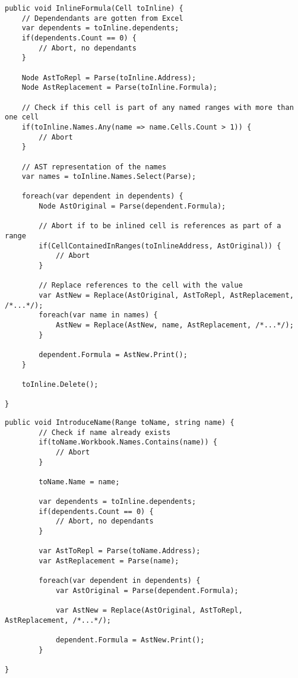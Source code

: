 \lstset{style=sharpc}
\begin{lstlisting}[float,caption={Inline Formula Refactoring (simplified)}, label={lst:inlineformula}]
public void InlineFormula(Cell toInline) {
	// Dependendants are gotten from Excel
	var dependents = toInline.dependents;
	if(dependents.Count == 0) {
		// Abort, no dependants
	}
	
	Node AstToRepl = Parse(toInline.Address);
	Node AstReplacement = Parse(toInline.Formula);
	
	// Check if this cell is part of any named ranges with more than one cell
	if(toInline.Names.Any(name => name.Cells.Count > 1)) {
		// Abort
	}
	
	// AST representation of the names
	var names = toInline.Names.Select(Parse);
	
	foreach(var dependent in dependents) {
		Node AstOriginal = Parse(dependent.Formula);
		
		// Abort if to be inlined cell is references as part of a range
		if(CellContainedInRanges(toInlineAddress, AstOriginal)) {
			// Abort
		}
		
		// Replace references to the cell with the value
		var AstNew = Replace(AstOriginal, AstToRepl, AstReplacement, /*...*/);
		foreach(var name in names) {
			AstNew = Replace(AstNew, name, AstReplacement, /*...*/);
		}
		
		dependent.Formula = AstNew.Print();
	}
	
	toInline.Delete();
	
}
\end{lstlisting}

\lstset{style=sharpc}
\begin{lstlisting}[float,caption={Introduce Cell Name (simplified)}, label={lst:introducecellname}]
public void IntroduceName(Range toName, string name) {
		// Check if name already exists
		if(toName.Workbook.Names.Contains(name)) {
			// Abort
		}
		
		toName.Name = name;
		
		var dependents = toInline.dependents;
		if(dependents.Count == 0) {
			// Abort, no dependants
		}
		
		var AstToRepl = Parse(toName.Address);
		var AstReplacement = Parse(name);
		
		foreach(var dependent in dependents) {
			var AstOriginal = Parse(dependent.Formula);
			
			var AstNew = Replace(AstOriginal, AstToRepl, AstReplacement, /*...*/);
			
			dependent.Formula = AstNew.Print();
		}
		
}
\end{lstlisting}

